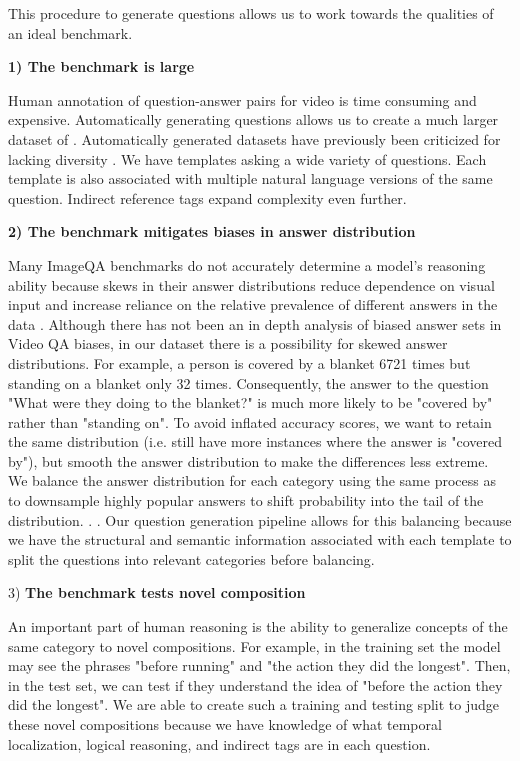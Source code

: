 \documentclass{article}
\newcommand{\mgm}[1]{{\color{cyan}{mgm: #1}}}
\begin{document}
This procedure to generate questions allows us to work towards the qualities of an ideal benchmark.
    
    \textbf{1) The benchmark is large} 
    
    Human annotation of question-answer pairs for video is time consuming and expensive. Automatically generating questions allows us to create a much larger dataset of \mgm{add here}. Automatically generated datasets have previously been criticized for lacking diversity \cite{yu2019activitynet}. We have \mgm{add} templates asking a wide variety of questions. Each template is also associated with multiple natural language versions of the same question. Indirect reference tags expand complexity even further.

    \textbf{2) The benchmark mitigates biases in answer distribution}
    
    Many ImageQA benchmarks do not accurately determine a model's reasoning ability because skews in their answer distributions reduce dependence on visual input and increase reliance on the relative prevalence of different answers in the data \cite{hudson2019gqa, goyal2017making}. Although there has not been an in depth analysis of biased answer sets in Video QA biases, in our dataset there is a possibility for skewed answer distributions. For example, a person is covered by a blanket 6721 times but standing on a blanket only 32 times. Consequently, the answer to the question "What were they doing to the blanket?" is much more likely to be "covered by" rather than "standing on". To avoid inflated accuracy scores, we want to retain the same distribution (i.e. still have more instances where the answer is "covered by"), but smooth the answer distribution to make the differences less extreme. We balance the answer distribution for each category using the same process as \cite{hudson2019gqa} to downsample highly popular answers to shift probability into the tail of the distribution. \mgm{Talk about the process in detail for doing that? Global vs local variables}. \mgm{Include graphs}. Our question generation pipeline allows for this balancing because we have the structural and semantic information associated with each template to split the questions into relevant categories before balancing. 
    
    3) \textbf{The benchmark tests novel composition}
    
    An important part of human reasoning is the ability to generalize concepts of the same category to novel compositions. For example, in the training set the model may see the phrases "before running" and "the action they did the longest". Then, in the test set, we can test if they understand the idea of "before the action they did the longest". We are able to create such a training and testing split to judge these novel compositions because we have knowledge of what temporal localization, logical reasoning, and indirect tags are in each question. \mgm{Potentially VG slide 18 for how to solve them?}
    
\end{document}
